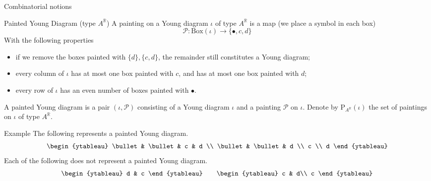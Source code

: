 \documentclass[fleqn,xcolor=dvipsnames]{beamer}
\newcommand{\BR}{{\mathbb {R}}}
\newcommand{\CP}{{\mathcal {P}}}
\begin{document}
\begin{frame}{Combinatorial notions}
  \begin{block}{Painted Young Diagram (type $A^{\BR}$)}
    A painting on a Young diagram $\iota$ of type $A^{\BR}$ is a map (we place a symbol in each box)
   $$\CP : \mathrm{Box}(\iota) \to \{ \bullet, c ,d \}$$
   With the following properties

   \begin{itemize}
      \pause\item if we remove the boxes painted with $\{d\}, \{c,d\}$, the remainder still constitutes a Young diagram;
      \pause\item every column of $\iota$ has at most one box painted with $c$, and has at most one box painted with $d$;
      \pause\item every row of $\iota$ has an even number of boxes painted with $\bullet$.
   \end{itemize}
   \pause A painted Young diagram is a pair $(\iota, \CP)$ consisting of a Young diagram $\iota$ and a painting $\CP$ on $\iota$. Denote by $\mathrm{P}_{A^{\BR}}(\iota)$ the set of paintings on $\iota$ of type $A^{\BR}$.
  \end{block}
  
\end{frame}

\begin{frame}
  \begin{block}{Example}
    The following represents a painted Young diagram.
    \[
    \begin{ytableau}
        \bullet & \bullet & c & d  \\
        \bullet & \bullet & d \\
        c \\
        d
    \end{ytableau}
    \]
    \pause Each of the following does not represent a painted Young diagram.
    \[
    \begin{ytableau}
      d & c
    \end{ytableau}
    \qquad
    \begin{ytableau}
      c & d\\
      c
    \end{ytableau}
    \]
  \end{block}
  
\end{frame}
\end{document}
